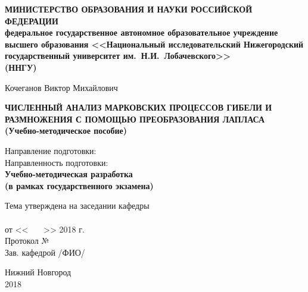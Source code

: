 \documentclass[12pt]{extarticle}
\begin{document}
\begin{titlepage}

  \begin{center}
    \textbf{МИНИСТЕРСТВО ОБРАЗОВАНИЯ И НАУКИ РОССИЙСКОЙ \\ ФЕДЕРАЦИИ\\
    федеральное государственное автономное образовательное учреждение\\
    высшего образования <<Национальный исследовательский Нижегородский\\ государственный университет им.~Н.И.~Лобачевского>>  \\(ННГУ)}
    
    \vfill 
    
    Кочеганов Виктор Михайлович
    \bigskip
    \bigskip
    \bigskip

    
     \textbf{ЧИСЛЕННЫЙ АНАЛИЗ МАРКОВСКИХ ПРОЦЕССОВ ГИБЕЛИ И \\
     РАЗМНОЖЕНИЯ С ПОМОЩЬЮ ПРЕОБРАЗОВАНИЯ ЛАПЛАСА\\
    (Учебно-методическое пособие)}
    
    \bigskip
    \bigskip
    Направление подготовки:\underline{\hspace{1cm}} \\
    Направленность подготовки:\underline{\hspace{1cm}}\\
    
 \vfill 
    \textbf{Учебно-методическая разработка\\
    (в рамках государственного экзамена)}
        \vfill 

        \begin{flushright}
    Тема утверждена на заседании кафедры\\
    \underline{\hspace{6.5cm}} \\
    от << \ \ \ >>\underline{\hspace{2cm}} 2018 г. \\
    Протокол №\underline{\hspace{0.5cm}} \\
   \medskip
    Зав. кафедрой \underline{\hspace{3cm}} /ФИО/\\
    \bigskip
    \end{flushright}


    Нижний Новгород \\ 2018
  \end{center}
  
\end{titlepage}
\end{document}
